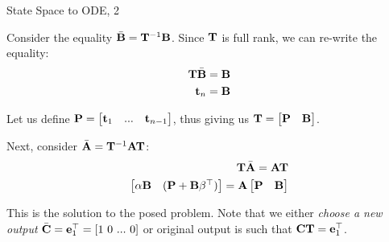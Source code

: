 \documentclass{beamer}
\begin{document}
\begin{frame}{State Space to ODE, 2}
	\begin{flushleft}
		
		Consider the equality $\bar{\mathbf{B}} = \mathbf{T}^{-1}\mathbf{B}$. Since $ \mathbf{T}$ is full rank, we can re-write the equality:
		\begin{align}
			\mathbf{T}\bar{\mathbf{B}} = \mathbf{B}
			\\
			\mathbf{t}_n = \mathbf{B}
		\end{align}
		
		Let us define $\mathbf{P} = 
		\begin{bmatrix}
			\mathbf{t}_1 & ... & \mathbf{t}_{n-1}
		\end{bmatrix}$, thus giving us $\mathbf{T} = 
		\begin{bmatrix}
		\mathbf{P}& \mathbf{B}
		\end{bmatrix}$.
		
		\bigskip
		
		Next, consider $\bar{\mathbf{A}} = \mathbf{T}^{-1}\mathbf{A}\mathbf{T}$:
		\begin{align}
			 \mathbf{T}\bar{\mathbf{A}} = \mathbf{A}\mathbf{T}
			 \\
			 \begin{bmatrix}
				\alpha \mathbf{B} & (\mathbf{P} + \mathbf{B}\beta^\top)
			 \end{bmatrix}
			 = 
			 \mathbf{A}
			 \begin{bmatrix}
			 	\mathbf{P}& \mathbf{B}
			 \end{bmatrix}
		\end{align}
		
		
		This is the solution to the posed problem. Note that we either \emph{choose a new output} $\bar{\mathbf{C}} = \mathbf{e}_1^\top = [1 \ 0 \ ... \ 0]$ or original output is such that $\mathbf{C}\mathbf{T} = \mathbf{e}_1^\top$.
		
		
	\end{flushleft}
\end{frame}





\myqrframe
\end{document}
